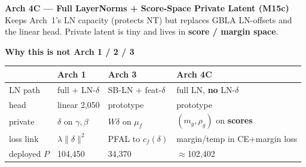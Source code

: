 \documentclass[11pt]{article}
\begin{document}
\begin{center}
{\Large\bfseries Arch 4C --- Full LayerNorms + Score-Space Private Latent (M15c)}\\[2pt]
{\small Keeps Arch~1's LN capacity (protects NT) but replaces GBLA LN-offsets and the linear head. Private latent is tiny and lives in \textbf{score / margin space}.}
\end{center}
\vspace{3mm}

\begin{center}
\end{center}

\vspace{4mm}
\begin{center}
{\normalsize\bfseries Why this is not Arch 1 / 2 / 3}
\end{center}
\vspace{2mm}
\begin{center}
\small
\begin{tabular}{L{35mm}L{50mm}L{50mm}L{50mm}}
\toprule
 & Arch 1 & Arch 3 & \textbf{Arch 4C} \\
\midrule
LN path & full + LN-$\delta$ & SB-LN + feat-$\delta$ & full LN, \textbf{no} LN-$\delta$ \\
head & linear 2{,}050 & prototype & prototype \\
private & $\delta$ on $\gamma,\beta$ & $W\delta$ on $\mu_f$ & $(m_g,\rho_g)$ on \textbf{scores} \\
loss link & $\lambda\|\delta\|^2$ & PFAL to $c_f(\delta)$ & margin/temp in CE+margin loss \\
deployed $P$ & 104{,}450 & 34{,}370 & $\approx$102{,}402 \\
\bottomrule
\end{tabular}
\end{center}
\end{document}
